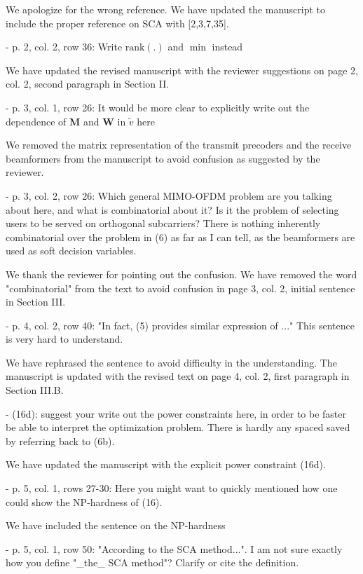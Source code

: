 \begin{itemize}
\begin{itemize}
\resp We apologize for the wrong reference. We have updated the manuscript to include the proper reference on SCA with [2,3,7,35].

 - p. 2, col. 2, row 36: Write $\text{rank}(.)$ and $\min$ instead

\resp We have updated the revised manuscript with the reviewer suggestions on page 2, col. 2, second paragraph in Section II.

 - p. 3, col. 1, row 26: It would be more clear to explicitly write out the dependence of $\mathbf{M}$ and $\mathbf{W}$ in $\tilde{v}$ here

\resp We removed the matrix representation of the transmit precoders and the receive beamformers from the manuscript to avoid confusion as suggested by the reviewer.

 - p. 3, col. 2, row 26: Which general MIMO-OFDM problem are you talking about here, and what is combinatorial about it? Is it the problem of selecting users to be served on orthogonal subcarriers? There is nothing inherently combinatorial over the problem in (6) as far as I can tell, as the beamformers are used as soft decision variables.

\resp We thank the reviewer for pointing out the confusion. We have removed the word "combinatorial" from the text to avoid confusion in page 3, col. 2, initial sentence in Section III.

 - p. 4, col. 2, row 40: "In fact, (5) provides similar expression of ..." This sentence is very hard to understand.

\resp We have rephrased the sentence to avoid difficulty in the understanding. The manuscript is updated with the revised text on page 4, col. 2, first paragraph in Section III.B.

 - (16d): suggest your write out the power constraints here, in order to be faster be able to interpret the optimization problem. There is hardly any spaced saved by referring back to (6b).

\resp We have updated the manuscript with the explicit power constraint (16d).

 - p. 5, col. 1, rows 27-30: Here you might want to quickly mentioned how one could show the NP-hardness of (16).

\resp We have included the sentence on the NP-hardness 

 - p. 5, col. 1, row 50: "According to the SCA method...". I am not sure exactly how you define "\_the\_ SCA method"? Clarify or cite the definition.


\end{itemize}
\end{itemize}
